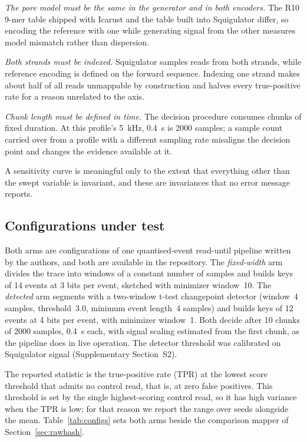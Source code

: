 \documentclass[11pt,a4paper]{article}
\begin{document}
\textit{The pore model must be the same in the generator and in both encoders.} The R10 9-mer
table shipped with Icarust and the table built into Squigulator differ, so encoding the reference
with one while generating signal from the other measures model mismatch rather than dispersion.

\textit{Both strands must be indexed.} Squigulator samples reads from both strands, while
reference encoding is defined on the forward sequence. Indexing one strand makes about half of all
reads unmappable by construction and halves every true-positive rate for a reason unrelated to the
axis.

\textit{Chunk length must be defined in time.} The decision procedure consumes chunks of fixed
duration. At this profile's 5~kHz, 0.4~s is 2000 samples; a sample count carried over from a
profile with a different sampling rate misaligns the decision point and changes the evidence
available at it.

A sensitivity curve is meaningful only to the extent that everything other than the swept
variable is invariant, and these are invariances that no error message reports.

\subsection{Configurations under test}\label{sec:configs}

Both arms are configurations of one quantised-event read-until pipeline written by the authors,
and both are available in the repository. The \textit{fixed-width} arm divides the trace into
windows of a constant number of samples and builds keys of 14 events at 3 bits per event, sketched
with minimizer window~10. The \textit{detected} arm segments with a two-window t-test changepoint
detector (window~4 samples, threshold~3.0, minimum event length~4 samples) and builds keys of 12
events at 4 bits per event, with minimizer window~1. Both decide after 10 chunks of 2000 samples,
0.4~s each, with signal scaling estimated from the first chunk, as the pipeline does in live
operation. The detector threshold was calibrated on Squigulator signal
(Supplementary Section~S2).

The reported statistic is the true-positive rate (TPR) at the lowest score threshold that admits
no control read, that is, at zero false positives. This threshold is set by the single
highest-scoring control read, so it has high variance when the TPR is low; for that reason we
report the range over seeds alongside the mean. Table~\ref{tab:configs} sets both arms beside the
comparison mapper of Section~\ref{sec:rawhash}.
\end{document}
